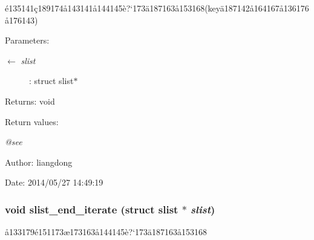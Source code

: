 \'{e}135141\c{c}189174\aa{}143141\aa{}144145\`{e}?`173\"{a}187163\aa{}153168(key\"{a}187142\aa{}164167\aa{}136176\aa{}176143) 

\begin{Desc}
\item[Parameters:]
\begin{description}
\item[\mbox{$\leftarrow$} {\em slist}]: struct slist$\ast$ \end{description}
\end{Desc}
\begin{Desc}
\item[Returns:]void \end{Desc}
\begin{Desc}
\item[Return values:]
\begin{description}
\item[{\em @see}]\end{description}
\end{Desc}
\begin{Desc}
\item[Author:]liangdong \end{Desc}
\begin{Desc}
\item[Date:]2014/05/27 14:49:19 \end{Desc}
\subsubsection{\setlength{\rightskip}{0pt plus 5cm}void slist\_\-end\_\-iterate (struct slist $\ast$ {\em slist})}\label{slist_8c_a19}


\aa{}133179\'{e}151173\ae{}173163\aa{}144145\`{e}?`173\"{a}187163\aa{}153168 

